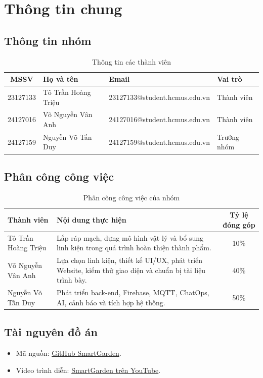 \section{Thông tin chung}

\subsection*{Thông tin nhóm}

\begin{table}[H]
\centering
\begin{tabularx}{\textwidth}{|c|X|X|p{2.4cm}|}\hline
\textbf{MSSV} & \textbf{Họ và tên} & \textbf{Email} & \textbf{Vai trò}\\ \hline
23127133 & Tô Trần Hoàng Triệu & 23127133@student.hcmus.edu.vn & Thành viên\\ \hline
24127016 & Võ Nguyễn Vân Anh & 24127016@student.hcmus.edu.vn & Thành viên\\ \hline
24127159 & Nguyễn Võ Tấn Duy & 24127159@student.hcmus.edu.vn & Trưởng nhóm\\ \hline
\end{tabularx}
\caption{Thông tin các thành viên}
\label{tab:MemInfor}
\end{table}

\subsection*{Phân công công việc}

\begin{table}[H]
\centering
\small
\begin{tabularx}{\textwidth}{|p{3.2cm}|X|c|}\hline
\textbf{Thành viên} & \textbf{Nội dung thực hiện} & \textbf{Tỷ lệ đóng góp}\\ \hline
Tô Trần Hoàng Triệu & Lắp ráp mạch, dựng mô hình vật lý và bổ sung linh kiện trong quá trình hoàn thiện thành phẩm. & 10\%\\ \hline
Võ Nguyễn Vân Anh & Lựa chọn linh kiện, thiết kế UI/UX, phát triển Website, kiểm thử giao diện và chuẩn bị tài liệu trình bày. & 40\%\\ \hline
Nguyễn Võ Tấn Duy & Phát triển back-end, Firebase, MQTT, ChatOps, AI, cảnh báo và tích hợp hệ thống. & 50\%\\ \hline
\end{tabularx}
\caption{Phân công công việc của nhóm}
\label{tab:task_allocation}
\end{table}

\subsection*{Tài nguyên đồ án}

\begin{itemize}
    \item Mã nguồn: \href{https://github.com/NguyenVoTanDuy2006/IOT-FINAL-PROJECT}{GitHub SmartGarden}.
    \item Video trình diễn: \href{https://youtu.be/lgPnNZcOgs0}{SmartGarden trên YouTube}.
\end{itemize}
\newpage
